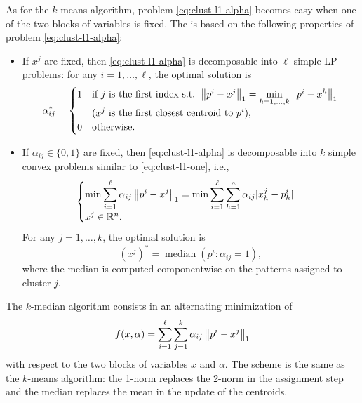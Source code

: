 As for the $k$-means algorithm, problem \eqref{eq:clust-l1-alpha} becomes easy when one of the two blocks of variables is fixed. The  is based on the following properties of problem \eqref{eq:clust-l1-alpha}:
\begin{itemize}
    \item If $x^j$ are fixed, then \eqref{eq:clust-l1-alpha} is decomposable into $\ell$ simple LP problems: for any $i=1,\dots,\ell$, the optimal solution is
    \[
    \alpha_{ij}^* =
    \begin{cases}
    1 & \text{if } j \text{ is the first index s.t. } \left\lVert p^i - x^j \right\rVert_1 = \min\limits_{h=1,\dots,k} \left\lVert p^i - x^h \right\rVert_1\\
      & \text{($x^j$ is the first closest centroid to $p^i$),}\\
    0 & \text{otherwise.}
    \end{cases}
    \]
    \item If $\alpha_{ij} \in \{0,1\}$ are fixed, then \eqref{eq:clust-l1-alpha} is decomposable into $k$ simple convex problems similar to \eqref{eq:clust-l1-one}, i.e.,
    \[
    \begin{cases}
    \displaystyle \min \sum_{i=1}^{\ell} \alpha_{ij}\left\lVert p^i - x^j \right\rVert_1 = \min \sum_{i=1}^{\ell}\sum_{h=1}^{n} \alpha_{ij}\lvert x^j_h - p^i_h \rvert\\[1ex]
    x^j \in \mathbb{R}^n.
    \end{cases}
    \]
    For any $j=1,\dots,k$, the optimal solution is
    \[
    (x^j)^* = \operatorname{median}(p^i : \alpha_{ij} = 1),
    \]
    where the median is computed componentwise on the patterns assigned to cluster $j$.
\end{itemize}

The $k$-median algorithm consists in an alternating minimization of
\[
f(x,\alpha) = \sum_{i=1}^{\ell}\sum_{j=1}^{k} \alpha_{ij}\left\lVert p^i - x^j \right\rVert_1
\]
with respect to the two blocks of variables $x$ and $\alpha$. The scheme is the same as the $k$-means algorithm: the 1-norm replaces the 2-norm in the assignment step and the median replaces the mean in the update of the centroids.

